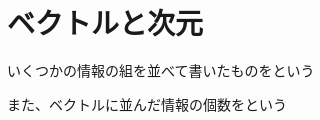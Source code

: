 \documentclass[../../../topic_linear-algebra]{subfiles}
\begin{document}
\sectionline
\section{ベクトルと次元}

いくつかの情報の組を並べて書いたものをという

また、ベクトルに並んだ情報の個数をという
\end{document}
